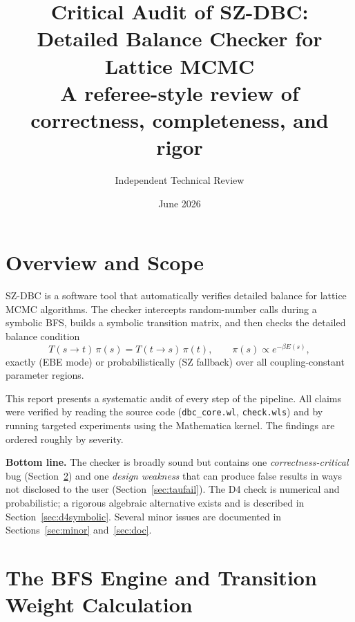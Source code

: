 \documentclass[12pt,a4paper]{article}
\title{\textbf{Critical Audit of SZ-DBC:\\Detailed Balance Checker for Lattice MCMC}\\[1ex]
\large A referee-style review of correctness, completeness, and rigor}
\author{Independent Technical Review}
\date{June 2026}
\theoremstyle{critical}
\theoremstyle{remark}
\begin{document}
\maketitle
\tableofcontents
\newpage

\section{Overview and Scope}

SZ-DBC is a software tool that automatically verifies detailed balance for lattice MCMC
algorithms. The checker intercepts random-number calls during a symbolic BFS, builds
a symbolic transition matrix, and then checks the detailed balance condition
\begin{equation}
T(s \to t)\,\pi(s) = T(t \to s)\,\pi(t), \qquad \pi(s) \propto e^{-\beta E(s)},
\label{eq:db}
\end{equation}
exactly (EBE mode) or probabilistically (SZ fallback) over all coupling-constant
parameter regions.

This report presents a systematic audit of every step of the pipeline. All claims were
verified by reading the source code (\texttt{dbc\_core.wl}, \texttt{check.wls}) and by
running targeted experiments using the Mathematica kernel. The findings are ordered
roughly by severity.

\begin{mdframed}[backgroundcolor=red!8,linecolor=red!60!black,linewidth=1pt]
\textbf{Bottom line.} The checker is broadly sound but contains one
\emph{correctness-critical} bug (Section~\ref{sec:weightbug}) and one
\emph{design weakness} that can produce false results in ways not disclosed to the user
(Section~\ref{sec:taufail}). The D4 check is numerical and probabilistic; a rigorous
algebraic alternative exists and is described in Section~\ref{sec:d4symbolic}.
Several minor issues are documented in Sections~\ref{sec:minor} and~\ref{sec:doc}.
\end{mdframed}

\section{The BFS Engine and Transition Weight Calculation}
\label{sec:weightbug}
\end{document}
